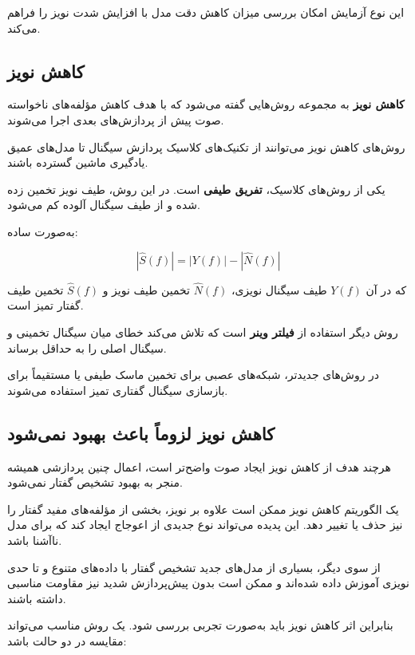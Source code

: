 این نوع آزمایش امکان بررسی میزان کاهش دقت مدل با افزایش شدت
نویز را فراهم می‌کند.


\subsection{کاهش نویز}

\textbf{کاهش نویز}
به مجموعه روش‌هایی گفته می‌شود که با هدف کاهش مؤلفه‌های
ناخواسته صوت پیش از پردازش‌های بعدی اجرا می‌شوند.

روش‌های کاهش نویز می‌توانند از تکنیک‌های کلاسیک پردازش سیگنال
تا مدل‌های عمیق یادگیری ماشین گسترده باشند.

یکی از روش‌های کلاسیک،
\textbf{تفریق طیفی}
است.
در این روش، طیف نویز تخمین زده شده و از طیف سیگنال آلوده
کم می‌شود.

به‌صورت ساده:

\begin{equation}
|\hat{S}(f)|
=
|Y(f)| - |\hat{N}(f)|
\end{equation}

که در آن $Y(f)$ طیف سیگنال نویزی،
$\hat{N}(f)$ تخمین طیف نویز و
$\hat{S}(f)$ تخمین طیف گفتار تمیز است.

روش دیگر استفاده از
\textbf{فیلتر وینر}
است که تلاش می‌کند خطای میان سیگنال تخمینی و سیگنال اصلی را
به حداقل برساند.

در روش‌های جدیدتر، شبکه‌های عصبی برای تخمین ماسک طیفی یا
مستقیماً برای بازسازی سیگنال گفتاری تمیز استفاده می‌شوند.


\subsection{کاهش نویز لزوماً باعث بهبود  نمی‌شود}

هرچند هدف از کاهش نویز ایجاد صوت واضح‌تر است، اعمال چنین
پردازشی همیشه منجر به بهبود تشخیص گفتار نمی‌شود.

یک الگوریتم کاهش نویز ممکن است علاوه بر نویز، بخشی از مؤلفه‌های
مفید گفتار را نیز حذف یا تغییر دهد.
این پدیده می‌تواند نوع جدیدی از اعوجاج ایجاد کند که برای مدل
 ناآشنا باشد.

از سوی دیگر، بسیاری از مدل‌های جدید تشخیص گفتار با داده‌های
متنوع و تا حدی نویزی آموزش داده شده‌اند و ممکن است بدون
پیش‌پردازش شدید نیز مقاومت مناسبی داشته باشند.

بنابراین اثر کاهش نویز باید به‌صورت تجربی بررسی شود.
یک روش مناسب می‌تواند مقایسه  در دو حالت باشد:


